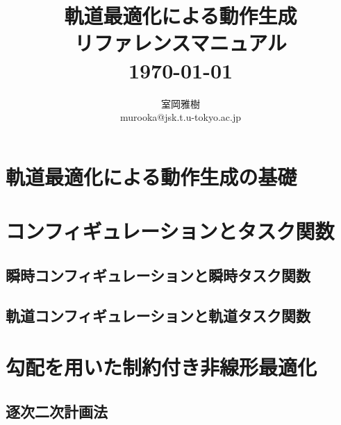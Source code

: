 \documentclass[]{jarticle}
\begin{document}
\newenvironment{refdesc}{
 \vspace{5mm} \parindent=0mm \topsep=0mm \parskip=0mm \leftmargin=10mm}{
             \parindent=10mm \topsep=3mm \parskip=1mm \leftmargin=0mm }


\date{}
\title{{\LARGE \bf 軌道最適化による動作生成 \\ リファレンスマニュアル} \\
\vspace{10mm}
{\large \today} \\
}

\author{
室岡雅樹 \\
murooka@jsk.t.u-tokyo.ac.jp \\
}

\thispagestyle{empty}
\maketitle
{}
\tableofcontents

\newpage
{}

\section{軌道最適化による動作生成の基礎}


\section{コンフィギュレーションとタスク関数} \label{chap:config-task}
\subsection{瞬時コンフィギュレーションと瞬時タスク関数} \label{sec:instant-config-task}

\subsection{軌道コンフィギュレーションと軌道タスク関数} \label{sec:trajectory-config-task}


\section{勾配を用いた制約付き非線形最適化} \label{chap:sqp}
\subsection{逐次二次計画法} \label{sec:sqp}

\end{document}
